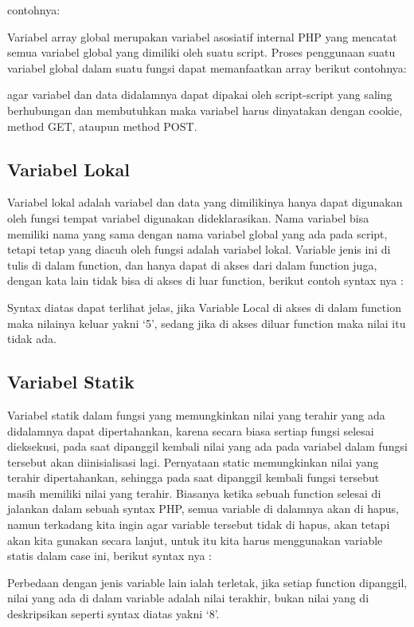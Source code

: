 contohnya:


Variabel array global merupakan variabel asosiatif internal PHP yang mencatat semua variabel global yang dimiliki oleh suatu script. Proses penggunaan suatu variabel global dalam suatu fungsi dapat memanfaatkan array  berikut contohnya:

agar variabel dan data didalamnya dapat dipakai oleh script-script yang saling berhubungan dan membutuhkan maka variabel harus dinyatakan dengan cookie, method GET, ataupun method POST.

\subsection{Variabel Lokal}
Variabel lokal adalah variabel dan data yang dimilikinya hanya dapat digunakan oleh fungsi tempat variabel digunakan dideklarasikan.
Nama variabel bisa memiliki nama yang sama dengan nama variabel global yang ada pada script, tetapi tetap yang diacuh oleh fungsi adalah variabel lokal.
Variable jenis ini di tulis di dalam function, dan hanya dapat di akses dari dalam function juga, dengan kata lain tidak bisa di akses di luar function, berikut contoh syntax nya :

Syntax diatas dapat terlihat jelas, jika Variable Local di akses di dalam function maka nilainya keluar yakni ‘5’, sedang jika di akses diluar function maka nilai itu tidak ada.

\subsection{Variabel Statik}
Variabel statik dalam fungsi yang memungkinkan nilai yang terahir yang ada didalamnya dapat dipertahankan, karena secara biasa sertiap fungsi selesai dieksekusi, pada saat dipanggil kembali nilai yang ada pada variabel dalam fungsi tersebut akan diinisialisasi lagi. Pernyataan static memungkinkan nilai yang terahir dipertahankan, sehingga pada saat dipanggil kembali fungsi tersebut masih memiliki nilai yang terahir. Biasanya ketika sebuah function selesai di jalankan dalam sebuah syntax PHP, semua variable di dalamnya akan di hapus, namun terkadang kita ingin agar variable tersebut tidak di hapus, akan tetapi akan kita gunakan secara lanjut, untuk itu kita harus menggunakan variable statis dalam case ini, berikut syntax nya :

Perbedaan dengan jenis variable lain ialah terletak, jika setiap function dipanggil, nilai yang ada di dalam variable adalah nilai terakhir, bukan nilai yang di deskripsikan seperti syntax diatas yakni ‘8’.


